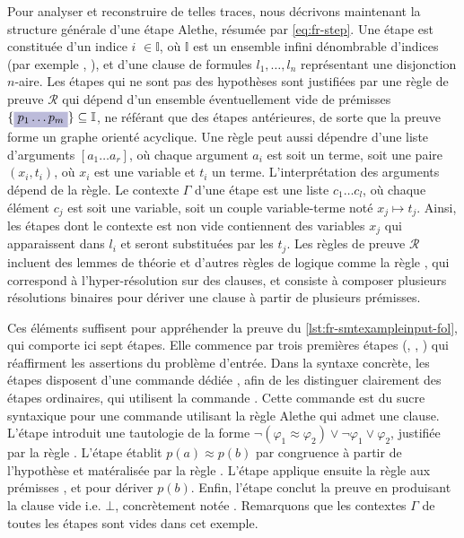 Pour analyser et reconstruire de telles traces, nous décrivons maintenant la structure générale d’une étape Alethe, résumée par \cref{eq:fr-step}.
Une étape est constituée d’un indice \colorbox{midpurple!30}{$i$} $\in \mathbb{I}$, où $\mathbb{I}$ est un ensemble infini dénombrable d’indices (par exemple , ), et d’une clause de formules \colorbox{Emerald!30}{$l_1, \dots, l_n$} représentant une disjonction $n$-aire.
Les étapes qui ne sont pas des hypothèses sont justifiées par une règle de preuve \colorbox{rxpurple2!30}{$\mathcal{R}$} qui dépend d’un ensemble éventuellement vide de prémisses $\{\colorbox{darkpurple!30}{$p_1 \dots p_m$}\} \subseteq \mathbb{I}$,
ne référant que des étapes antérieures, de sorte que la preuve forme un graphe orienté acyclique.
Une règle peut aussi dépendre d'une liste d'arguments \colorbox{rxpink!30}{$[a_1 \dots a_r]$}, où chaque argument $a_i$ est soit un terme, soit une paire $(x_i, t_i)$, où $x_i$ est une variable et $t_i$ un terme.
L'interprétation des arguments dépend de la règle.
Le contexte \colorbox{RoyalBlue!30}{$\Gamma$} d'une étape est une liste $c_1 \dots c_l$, où chaque élément $c_j$ est soit une variable, soit un couple variable-terme noté $x_j \mapsto t_j$.
Ainsi, les étapes dont le contexte est non vide contiennent des variables $x_j$ qui apparaissent dans \colorbox{Emerald!30}{$l_i$} et seront substituées par les $t_j$.
Les règles de preuve \colorbox{rxpurple2!30}{$\mathcal{R}$} incluent des lemmes de théorie et d'autres règles de logique comme la règle , qui correspond à l’hyper-résolution sur des clauses,
et consiste à composer plusieurs résolutions binaires pour dériver une clause à partir de plusieurs prémisses.

Ces éléments suffisent pour appréhender la preuve du \cref{lst:fr-smtexampleinput-fol}, qui comporte ici sept étapes.
Elle commence par trois premières étapes  (, , ) qui réaffirment les assertions du problème d'entrée.
Dans la syntaxe concrète, les étapes  disposent d'une commande dédiée , afin de les distinguer clairement des étapes ordinaires, qui utilisent la commande .
Cette commande est du sucre syntaxique pour une commande  utilisant la règle Alethe  qui admet une clause.
L'étape  introduit une tautologie de la forme $\neg (\varphi_1 \approx \varphi_2) \lor \neg \varphi_1 \lor \varphi_2$, justifiée par la règle \colorbox{rxpurple2!30}{}.
L'étape  établit $p(a) \approx p(b)$ par congruence à partir de l'hypothèse  et matéralisée par la règle \colorbox{rxpurple2!30}{}.
L'étape  applique ensuite la règle \colorbox{rxpurple2!30}{} aux prémisses ,  et  pour dériver $p(b)$.
Enfin, l'étape  conclut la preuve en produisant la clause vide i.e. $\bot$, concrètement notée .
Remarquons que les contextes \colorbox{RoyalBlue!30}{$\Gamma$} de toutes les étapes sont vides dans cet exemple.

